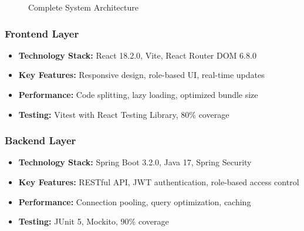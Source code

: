 \documentclass[12pt,a4paper]{article}
\begin{document}
\begin{figure}[H]
\centering
{}
\caption{Complete System Architecture}
\label{fig:complete-system-architecture}
\end{figure}

\subsubsection{Frontend Layer}
\begin{itemize}
    \item \textbf{Technology Stack:} React 18.2.0, Vite, React Router DOM 6.8.0
    \item \textbf{Key Features:} Responsive design, role-based UI, real-time updates
    \item \textbf{Performance:} Code splitting, lazy loading, optimized bundle size
    \item \textbf{Testing:} Vitest with React Testing Library, 80\% coverage
\end{itemize}

\subsubsection{Backend Layer}
\begin{itemize}
    \item \textbf{Technology Stack:} Spring Boot 3.2.0, Java 17, Spring Security
    \item \textbf{Key Features:} RESTful API, JWT authentication, role-based access control
    \item \textbf{Performance:} Connection pooling, query optimization, caching
    \item \textbf{Testing:} JUnit 5, Mockito, 90\% coverage
\end{itemize}
\end{document}
